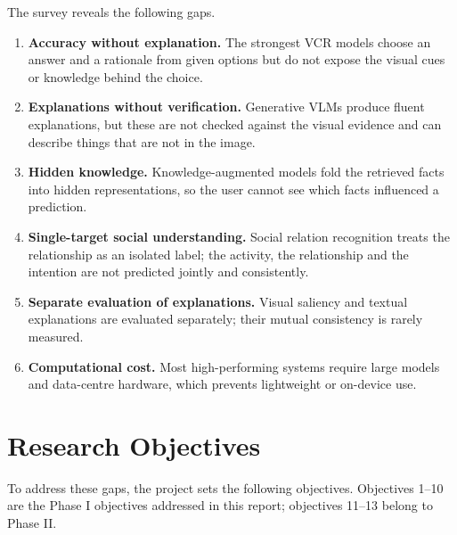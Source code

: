 \documentclass[12pt,a4paper,oneside]{report}
\begin{document}
The survey reveals the following gaps.

\begin{enumerate}[label=\textbf{G\arabic*.},leftmargin=*]
\item \textbf{Accuracy without explanation.} The strongest VCR models choose an
  answer and a rationale from given options but do not expose the visual cues
  or knowledge behind the choice.
\item \textbf{Explanations without verification.} Generative VLMs produce
  fluent explanations, but these are not checked against the visual evidence
  and can describe things that are not in the image.
\item \textbf{Hidden knowledge.} Knowledge-augmented models fold the retrieved
  facts into hidden representations, so the user cannot see which facts
  influenced a prediction.
\item \textbf{Single-target social understanding.} Social relation recognition
  treats the relationship as an isolated label; the activity, the relationship
  and the intention are not predicted jointly and consistently.
\item \textbf{Separate evaluation of explanations.} Visual saliency and textual
  explanations are evaluated separately; their mutual consistency is rarely
  measured.
\item \textbf{Computational cost.} Most high-performing systems require large
  models and data-centre hardware, which prevents lightweight or on-device use.
\end{enumerate}

\section{Research Objectives}
\label{sec:objectives}

To address these gaps, the project sets the following objectives. Objectives
1--10 are the Phase I objectives addressed in this report; objectives 11--13
belong to Phase II.
\end{document}
